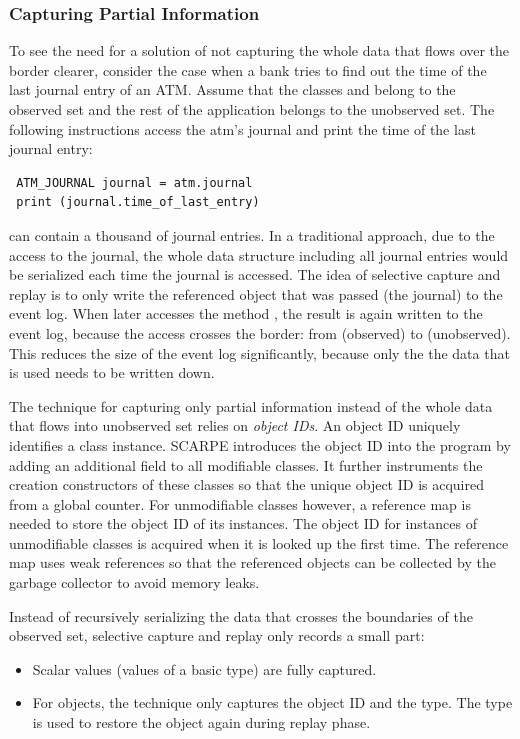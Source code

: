 \subsubsection{Capturing Partial Information}
To see the need for a solution of not capturing the whole data that flows over the border clearer, consider the case when a bank tries to find out the time of the last journal entry of an ATM. Assume that the classes  and  belong to the observed set and the rest of the application belongs to the unobserved set. The following instructions access the atm's journal and print the time of the last journal entry:

\javalisting
\begin{lstlisting}
 ATM_JOURNAL journal = atm.journal
 print (journal.time_of_last_entry)
\end{lstlisting}

 can contain a thousand of journal entries. In a traditional approach, due to the access to the journal, the whole data structure including all journal entries would be serialized each time the journal is accessed. The idea of selective capture and replay is to only write the referenced object that was passed (the journal) to the event log. When later  accesses the method , the result is again written to the event log, because the access crosses the border: from  (observed) to  (unobserved). This reduces the size of the event log significantly, because only the the data that is used needs to be written down.

The technique for capturing only partial information instead of the whole data that flows into unobserved set relies on \emph{object IDs}. An object ID uniquely identifies a class instance. SCARPE introduces the object ID into the program by adding an additional field to all modifiable classes. It further instruments the creation constructors of these classes so that the unique object ID is acquired from a global counter. For unmodifiable classes however, a reference map is needed to store the object ID of its instances. The object ID for instances of unmodifiable classes is acquired when it is looked up the first time. The reference map uses weak references so that the referenced objects can be collected by the garbage collector to avoid memory leaks.

Instead of recursively serializing the data that crosses the boundaries of the observed set, selective capture and replay only records a small part:
\begin{itemize}
 \item Scalar values (values of a basic type) are fully captured.
 \item For objects, the technique only captures the object ID and the type. The type is used to restore the object again during replay phase.
\end{itemize}


